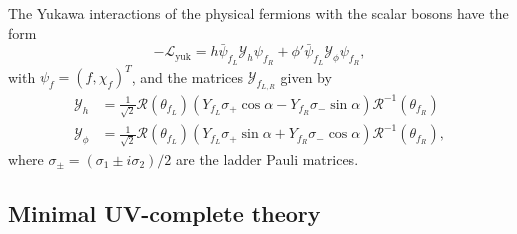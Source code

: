 \noindent The Yukawa interactions of the physical fermions with the scalar bosons have the form
\begin{equation}
    -\mathcal{L}_{\text{yuk}} 
    = h \bar\psi_{f_L} \mathcal{Y}_{h}\psi_{f_R} + \phi' \bar\psi_{f_L} \mathcal{Y}_{\phi}\psi_{f_R},
\end{equation} 
with $\psi_{f} = (f,\chi_{f})^T$, and the matrices $\mathcal{Y}_{f_{L,R}}$ given by
\begin{align}
    \mathcal{Y}_{h} &= \frac{1}{\sqrt{2}}
    \mathcal{R}(\theta_{f_L})
    \left(
        Y_{f_L}\sigma_+ \cos\alpha 
    - 
    Y_{f_R}\sigma_-\sin\alpha
    \right)
    \mathcal{R}^{-1}(\theta_{f_R})\label{eq:YukawaL}
    \\
    \mathcal{Y}_{\phi} &= \frac{1}{\sqrt{2}}
    \mathcal{R}(\theta_{f_L})
    \left(
    Y_{f_L}\sigma_+ \sin\alpha
    +
    Y_{f_R}\sigma_-\cos\alpha
    \right)
    \mathcal{R}^{-1}(\theta_{f_R}),\label{eq:YukawaR}
\end{align}
where $\sigma_{\pm}=(\sigma_1\pm i\sigma_2)/2$ are the ladder Pauli matrices.

\subsection{Minimal UV-complete theory}

